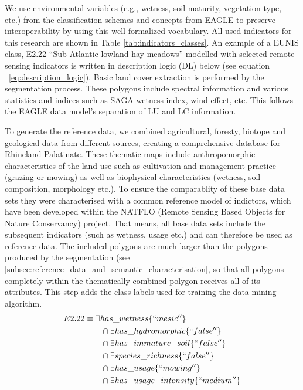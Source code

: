 \documentclass[authoryear, review,12pt,number]{elsarticle}
\begin{document}
We use environmental variables (e.g., wetness, soil maturity, vegetation type,
etc.) from the classification schemes and concepts from EAGLE to preserve
interoperability by using this well-formalized vocabulary. All used indicators
for this research are shown in Table \ref{tab:indicators_classes}. An example of
a EUNIS class, E2.22 ``Sub-Atlantic lowland hay meadows'' modelled with selected
remote sensing indicators is written in description logic (DL) below (see
equation ~\ref{eq:description_logic}). Basic land cover extraction is performed
by the segmentation process. 
These polygons include spectral information and various statistics and indices
such as SAGA wetness index, wind effect, etc. This follows the EAGLE data
model's separation of LU and LC information.

To generate the reference data, we combined agricultural, foresty, biotope and
geological data from different sources, creating a comprehensive database for
Rhineland Palatinate. These thematic maps include anthropomorphic
characteristics of the land use such as cultivation and management practice (grazing or mowing)
as well as biophysical characteristics (wetness, soil composition, morphology
etc.). To ensure the comparablity of these base data sets they were
characterised with a common reference model of indictors, which have been
developed within the NATFLO (Remote Sensing Based Objects for Nature
Conservancy) project.  That means, all base data sets include the subsequent
indicators (such as wetness, usage etc.) and can therefore be used as reference
data. The included polygons are much larger than the polygons produced by the
segmentation (see \ref{subsec:reference_data_and_semantic_characterisation}, so that all polygons completely within the thematically combined polygon receives all of its attributes. This step adds the class labels used for training the data mining algorithm.
\begin{equation}
\begin{align*}
E2.22 &\equiv \exists has\_wetness \{``mesic''\} \\
&\qquad {} \cap \exists has\_hydromorphic \{``false''\} \\
&\qquad {} \cap \exists has\_immature\_soil \{``false''\} \\
&\qquad {} \cap \exists species\_richness \{``false''\} \\
&\qquad {} \cap \exists has\_usage \{``mowing''\} \\
&\qquad {} \cap \exists has\_usage\_intensity \{``medium''\} \\
\end{align*}
\label{eq:description_logic}
\end{equation}
\label{subsec:Selection_of_training_validation_data}
\end{document}
